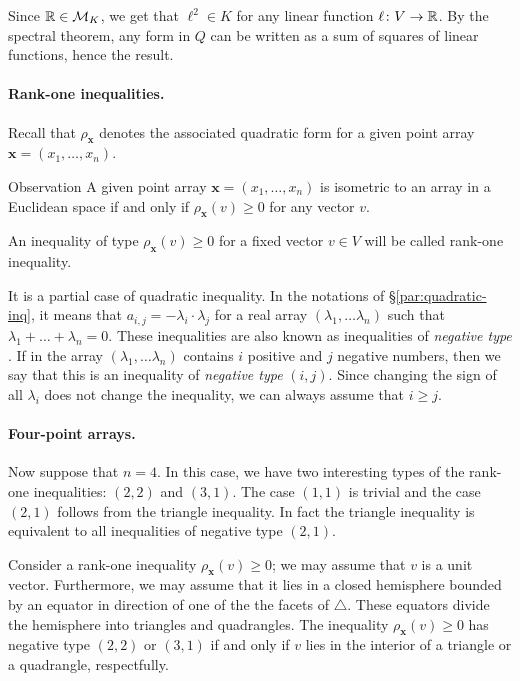 \documentclass[a4paper,10pt]{article}
\begin{document}
Since $\mathbb{R}\in \mathcal{M}_K$, we get that $\ell^2\in K$ for any linear function $\ell\colon V\to\mathbb{R}$.
By the spectral theorem, any form in $Q$ can be written as a sum of squares of linear functions, hence the result.
\qeds

\paragraph{Rank-one inequalities.}\label{par:rank-one}
Recall that $\rho_{\bm{x}}$ denotes the associated quadratic form for a given point array $\bm{x}=(x_1,\dots,x_n)$.

\begin{thm}{Observation}
A given point array $\bm{x}=(x_1,\dots,x_n)$ is isometric to an array in a Euclidean space if and only if $\rho_{\bm{x}}(v)\ge 0$ for any vector $v$.
\end{thm}

An inequality of type $\rho_{\bm{x}}(v)\ge 0$ for a fixed vector $v\in V$ will be called rank-one inequality.

It is a partial case of quadratic inequality.
In the notations of §\ref{par:quadratic-inq}, it means that $a_{i,j}=-\lambda_i\cdot\lambda_j$ for a real array $(\lambda_1,\dots \lambda_n)$ such that 
$\lambda_1+\dots+\lambda_n=0$.
These inequalities are also known as inequalities of \emph{negative type} \cite{deza-lauren}.
If in the array $(\lambda_1,\dots \lambda_n)$ contains $i$ positive and $j$ negative numbers,
then we say that this is an inequality of \emph{negative type} $(i,j)$.
Since changing the sign of all $\lambda_i$ does not change the inequality, we can always assume that $i\ge j$.

\paragraph{Four-point arrays.}\label{Four-point arrays}
Now suppose that $n=4$.
In this case, we have two interesting types of the rank-one inequalities: $(2,2)$ and $(3,1)$.
The case $(1,1)$ is trivial and 
the case $(2,1)$ follows from the triangle inequality.
In fact the triangle inequality is equivalent to all inequalities of negative type $(2,1)$.

Consider a rank-one inequality $\rho_{\bm{x}}(v)\ge 0$; we may assume that $v$ is a unit vector.
Furthermore, we may assume that it lies in a closed hemisphere bounded by an equator in direction of one of the the facets of $\triangle$.
These equators divide the hemisphere into triangles and quadrangles.
The inequality $\rho_{\bm{x}}(v)\ge 0$ has negative type $(2,2)$ or $(3,1)$
if and only if $v$ lies in the interior of a triangle or a quadrangle, respectfully.
\end{document}

